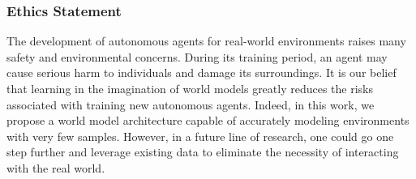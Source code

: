 \subsubsection*{Ethics Statement}
\label{section:ethics}

The development of autonomous agents for real-world environments raises many safety and environmental concerns. During its training period, an agent may cause serious harm to individuals and damage its surroundings. It is our belief that learning in the imagination of world models greatly reduces the risks associated with training new autonomous agents. Indeed, in this work, we propose a world model architecture capable of accurately modeling environments with very few samples. However, in a future line of research, one could go one step further and leverage existing data to eliminate the necessity of interacting with the real world.